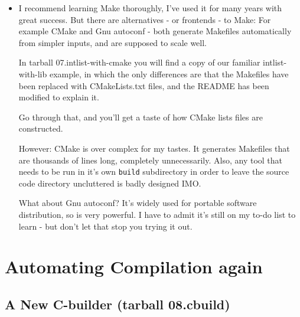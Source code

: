 \documentclass[aspectratio=169]{beamer}
\begin{document}
\begin{frame}[fragile]

    \begin{itemize}
      \item
        I recommend learning Make thoroughly, I've used it for many years
	with great success.
      \pitem
	But there are alternatives - or frontends - to Make:
	For example \alert{CMake} and \alert{Gnu autoconf} -
	both generate \alert{Makefiles} automatically from simpler
	inputs, and are supposed to scale well.

      \pitem
      In tarball \alert{07.intlist-with-cmake} you will find a copy of our
      familiar intlist-with-lib example, in which the \alert{only}
      differences are that the Makefiles have been replaced with
      CMakeLists.txt files, and the README has been modified to explain it.

      \pitem
      Go through that, and you'll get a taste of how CMake lists files
      are constructed.
      
      \pitem
      However: CMake is over complex for my tastes.  It generates Makefiles that
      are thousands of lines long, completely unnecessarily.
      Also, any tool that needs to be run in it's own \verb+build+
      subdirectory in order to leave the source code directory uncluttered
      is badly designed IMO.

      \pitem
      What about \alert{Gnu autoconf}?  It's widely used for portable software distribution,
      so is very powerful.  I have to admit it's still on my to-do list to learn - but don't
      let that stop you trying it out.

    \end{itemize}

\end{frame}

\section{Automating Compilation again}
\subsection{A New C-builder (tarball 08.cbuild)}
\end{document}
